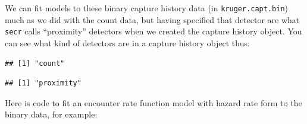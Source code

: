 We can fit models to these binary capture history data (in \texttt{kruger.capt.bin}) much as we did with the count data, but having specified that detector are what \texttt{secr} calls ``proximity'' detectors when we created the capture history object. You can see what kind of detectors are in a capture history object thus:
{\small
\begin{knitrout}
\color{fgcolor}\begin{kframe}
\begin{alltt}
\end{alltt}
\begin{verbatim}
## [1] "count"
\end{verbatim}
\begin{alltt}
\end{alltt}
\begin{verbatim}
## [1] "proximity"
\end{verbatim}
\end{kframe}
\end{knitrout}
} 

Here is code to fit an encounter rate function model with hazard rate form to the binary data, for example:
{\small
\begin{knitrout}
\color{fgcolor}\begin{kframe}
\begin{alltt}
\hlkwb{=}
\hlkwb{=}\hlopt{~}\hlopt{~}\hlstd{)}
\hlkwb{=} 
                       \hlstd{=}\hlopt{~}\hlopt{~}\hlstd{),} \hlstd{=}\hlstd{)}
\end{alltt}
\end{kframe}
\end{knitrout}
} 

